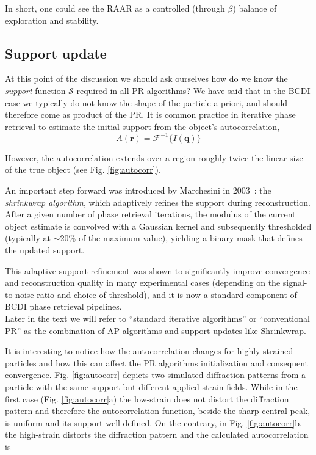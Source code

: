 In short, one could see the RAAR as a controlled (through $\beta$) balance of exploration and stability. 

\subsection{Support update}
At this point of the discussion we should ask ourselves how do we know the \textit{support} function $\mathcal{S}$
required in all PR algorithms? We have said that in the BCDI case we typically do not know the shape of the particle 
a priori, and should therefore come as product of the PR.  
It is common practice in iterative phase retrieval to estimate the initial support 
from the object's autocorrelation,
\begin{equation}
    A(\mathbf{r}) = \mathcal{F}^{-1}\{ I(\mathbf{q}) \}
\end{equation}

However, the autocorrelation extends over a region roughly twice the linear size of the true object (see Fig. \ref{fig:autocorr}). 


An important step forward was introduced by Marchesini in 2003~\cite{Marchesini_shrinkwrap}: 
the \textit{shrinkwrap algorithm}, which adaptively refines the support during reconstruction. 
After a given number of phase retrieval iterations, the modulus of the current object estimate is 
convolved with a Gaussian kernel and subsequently thresholded (typically at $\sim$20\% of the maximum value), 
yielding a binary mask that defines the updated support. 

This adaptive support refinement was shown to significantly improve convergence and reconstruction quality 
in many experimental cases (depending on the signal-to-noise ratio and choice of threshold), and it is now a 
standard component of BCDI phase retrieval pipelines.\\

Later in the text we will refer to ``standard iterative algorithms'' or ``conventional PR'' as the combination of AP 
algorithms and support updates like Shrinkwrap. 


It is interesting to notice how the autocorrelation changes for highly strained particles and
how this can affect the PR algorithms initialization and consequent convergence. Fig. \ref{fig:autocorr}
depicts two simulated diffraction patterns from a particle with the same support but different applied strain fields. 
While in the first case (Fig. \ref{fig:autocorr}a) the low-strain does not distort the diffraction pattern and therefore the autocorrelation 
function, beside the sharp central peak, is uniform and its support well-defined. On the contrary, in Fig. \ref{fig:autocorr}b, 
the high-strain distorts the diffraction pattern and the calculated autocorrelation is 

